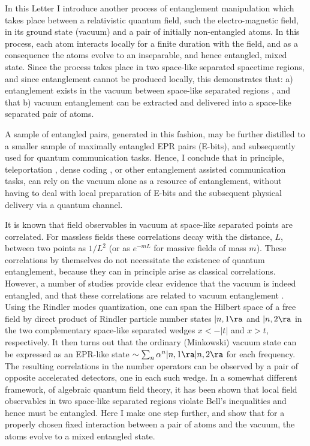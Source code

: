 In this Letter I introduce another process of entanglement
manipulation which takes place between a relativistic quantum field,
 such the electro-magnetic field,
in its ground state (vacuum) and a pair of initially non-entangled atoms.
In this process, each atom interacts locally for a finite duration with
the field,  and as a consequence the atoms evolve to an
inseparable, and hence entangled, mixed state.
Since the process takes place in two space-like separated spacetime
regions,
and since entanglement cannot be produced locally, this demonstrates that:
a) entanglement exists in the vacuum between space-like
separated regions  \cite{unruh,werner},
and that
b) vacuum entanglement can be extracted and delivered into a space-like
separated pair of atoms.


A sample of entangled pairs, generated in this fashion,
may be further distilled to a smaller sample of
maximally entangled EPR pairs (E-bits),
and subsequently used for quantum communication
tasks. Hence, I conclude that in principle, teleportation
\cite{teleportation},
dense coding \cite{densecoding},
or other entanglement  assisted communication tasks,
can rely on the vacuum alone as a resource of entanglement,
without having to deal with local preparation of E-bits and
the subsequent physical delivery via a quantum channel.


It is known that field observables in vacuum
at space-like separated points are correlated.
For  massless fields these correlations decay
with the distance,  $L$, between two points as $ 1/L^{2}$
(or as $e^{-mL}$ for massive fields of mass $m$).
These correlations by themselves do not necessitate
the existence of quantum entanglement, because
they can in principle arise as classical correlations.
However, a number of studies provide clear evidence that
the vacuum is indeed entangled\cite{unruh,werner}, and that these
correlations are related to vacuum entanglement \cite{clifton}.
Using the Rindler modes quantization,
one can span the Hilbert space of a free field by direct product
of Rindler particle number states  $|n,1\ra$ and $|n,2\ra$
in the two complementary space-like separated wedges $x<-|t|$ and $x>t$,
respectively.
It then turns out \cite{unruh}
that the ordinary (Minkowski) vacuum state
can be expressed as an EPR-like state  $\sim \sum_n \alpha^n
|n,1\ra|n,2\ra$ for each frequency.
The resulting  correlations in the number operators can be observed
by a pair of opposite accelerated detectors,
one in each such wedge.
In a somewhat different framework, of algebraic quantum
field theory, it has been shown \cite{werner}
that local field observables in two space-like
separated regions violate Bell's inequalities
and hence must be entangled.
Here I make one step further, and show that
for a properly chosen fixed interaction between a pair of atoms
and the vacuum, the atoms evolve to a mixed entangled state.


